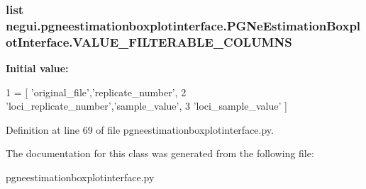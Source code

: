\subsubsection[{\texorpdfstring{V\+A\+L\+U\+E\+\_\+\+F\+I\+L\+T\+E\+R\+A\+B\+L\+E\+\_\+\+C\+O\+L\+U\+M\+NS}{VALUE_FILTERABLE_COLUMNS}}]{\setlength{\rightskip}{0pt plus 5cm}list negui.\+pgneestimationboxplotinterface.\+P\+G\+Ne\+Estimation\+Boxplot\+Interface.\+V\+A\+L\+U\+E\+\_\+\+F\+I\+L\+T\+E\+R\+A\+B\+L\+E\+\_\+\+C\+O\+L\+U\+M\+NS\hspace{0.3cm}{\ttfamily [static]}}\hypertarget{classnegui_1_1pgneestimationboxplotinterface_1_1PGNeEstimationBoxplotInterface_a274e14eec260006cc090be3f9dffe7dd}{}\label{classnegui_1_1pgneestimationboxplotinterface_1_1PGNeEstimationBoxplotInterface_a274e14eec260006cc090be3f9dffe7dd}
{\bfseries Initial value\+:}
\begin{DoxyCode}
1 = [ \textcolor{stringliteral}{'original\_file'},\textcolor{stringliteral}{'replicate\_number'},
2                                 \textcolor{stringliteral}{'loci\_replicate\_number'},\textcolor{stringliteral}{'sample\_value'}, 
3                                                         \textcolor{stringliteral}{'loci\_sample\_value'} ]
\end{DoxyCode}


Definition at line 69 of file pgneestimationboxplotinterface.\+py.



The documentation for this class was generated from the following file\+:\begin{DoxyCompactItemize}
\item 
pgneestimationboxplotinterface.\+py\end{DoxyCompactItemize}
